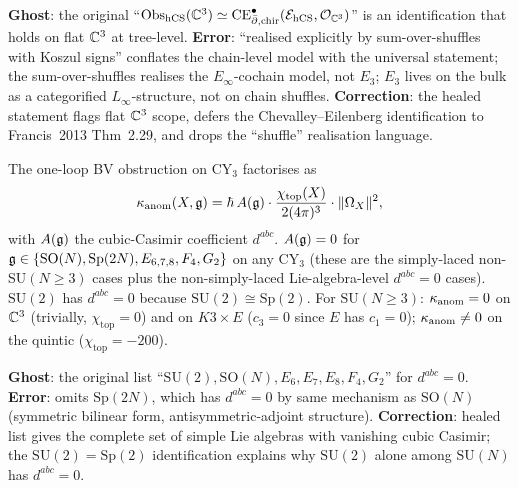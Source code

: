 \textbf{Ghost}: the original ``$\mathrm{Obs}_{\mathrm{hCS}}(\mathbb{C}^3) \simeq \mathrm{CE}^\bullet_{\bar\partial, \mathrm{chir}}(\mathcal{E}_{\mathrm{hCS}}, \mathcal{O}_{\mathbb{C}^3})$'' is an identification that holds on flat $\mathbb{C}^3$ at tree-level. \textbf{Error}: ``realised explicitly by sum-over-shuffles with Koszul signs'' conflates the chain-level model with the universal statement; the sum-over-shuffles realises the $E_\infty$-cochain model, not $E_3$; $E_3$ lives on the bulk as a categorified $L_\infty$-structure, not on chain shuffles. \textbf{Correction}: the healed statement flags flat $\mathbb{C}^3$ scope, defers the Chevalley--Eilenberg identification to Francis~2013 Thm~2.29, and drops the ``shuffle'' realisation language.

\begin{theorem}\ClaimStatusHealed
\label{wn:thm:healed-anomaly}
The one-loop BV obstruction on CY$_3$ factorises as
\[
\kappa_{\mathrm{anom}}(X, \mathfrak{g}) = \hbar\, A(\mathfrak{g}) \cdot \frac{\chi_{\mathrm{top}}(X)}{2(4\pi)^3} \cdot \|\Omega_X\|^2,
\]
with $A(\mathfrak{g})$ the cubic-Casimir coefficient $d^{abc}$. $A(\mathfrak{g}) = 0$ for $\mathfrak{g} \in \{\mathrm{SO}(N), \mathrm{Sp}(2N), E_{6,7,8}, F_4, G_2\}$ on any CY$_3$ (these are the simply-laced non-SU$(N \geq 3)$ cases plus the non-simply-laced Lie-algebra-level $d^{abc} = 0$ cases). $\mathrm{SU}(2)$ has $d^{abc} = 0$ because $\mathrm{SU}(2) \cong \mathrm{Sp}(2)$. For $\mathrm{SU}(N \geq 3)$: $\kappa_{\mathrm{anom}} = 0$ on $\mathbb{C}^3$ (trivially, $\chi_{\mathrm{top}} = 0$) and on $K3 \times E$ ($c_3 = 0$ since $E$ has $c_1 = 0$); $\kappa_{\mathrm{anom}} \neq 0$ on the quintic ($\chi_{\mathrm{top}} = -200$).
\end{theorem}

\textbf{Ghost}: the original list ``$\mathrm{SU}(2), \mathrm{SO}(N), E_6, E_7, E_8, F_4, G_2$'' for $d^{abc} = 0$. \textbf{Error}: omits $\mathrm{Sp}(2N)$, which has $d^{abc} = 0$ by same mechanism as $\mathrm{SO}(N)$ (symmetric bilinear form, antisymmetric-adjoint structure). \textbf{Correction}: healed list gives the complete set of simple Lie algebras with vanishing cubic Casimir; the $\mathrm{SU}(2) = \mathrm{Sp}(2)$ identification explains why $\mathrm{SU}(2)$ alone among $\mathrm{SU}(N)$ has $d^{abc} = 0$.

